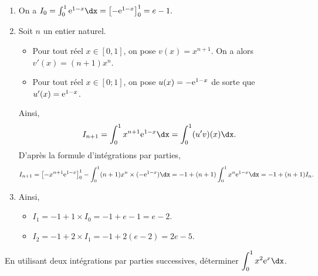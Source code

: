 \documentclass[11pt,fleqn, openany]{book} %
\begin{document}
\begin{solution}\hspace{0pt}
\begin{enumerate}
\item  On a \(I_0=\int_0^1\e^{1-x}\dx=\left[-\e^{1-x}\right]_0^1=e-1.\)
\item  Soit \(n\) un entier naturel.

\begin{itemize}
\item  Pour tout réel \(x\in [0,1]\), on pose \(v(x)=x^{n+1}\). On a alors \(v'(x)=(n+1)x^{n}\).
\item  Pour tout réel \(x\in [0;1]\), on pose \(u(x)=-\mathrm{e}^{1-x}\) de sorte que \(u'(x)=\mathrm{e}^{1-x}\).
\end{itemize}
Ainsi, 
\[I_{n+1}=\int_0^1x^{n+1}\e^{1-x}\dx=\int_{0}^1 (u'v)(x)\dx.\]
D'après la formule d'intégrations par parties,
\[ I_{n+1}= \left[-x^{n+1}\e^{1-x}\right]_0^1-\int_0^1 (n+1)x^n \times (-\e^{1-x})\dx=-1+(n+1)\int_0^1x^n\e^{1-x}\dx=-1+(n+1)I_n.\]
\item  Ainsi,
\begin{itemize}
\item  \(I_1=-1+1\times I_0=-1+e-1=e-2\).
\item  \(I_2=-1+2\times I_1 = -1+2(e-2)=2e-5\).
\end{itemize}
\end{enumerate}\end{solution}


\begin{exercise}[topic=int03]En utilisant deux intégrations par parties successives, déterminer $\displaystyle\int_0^1x^2\e^x\dx$.\end{exercise}
\end{document}
